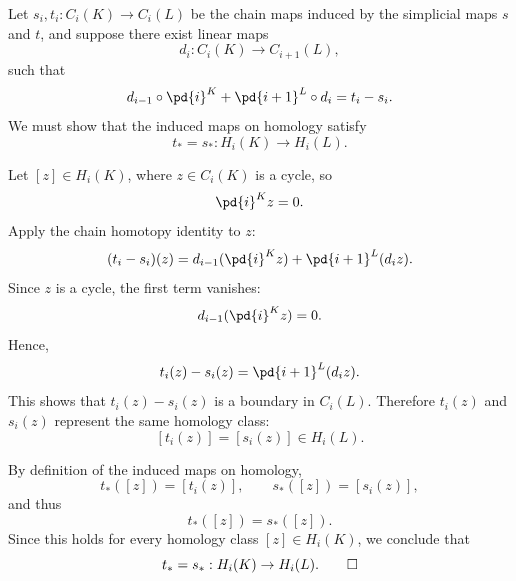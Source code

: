 \begin{solution}
  Let $s_i, t_i : C_i(K) \to C_i(L)$ be the chain maps induced by the simplicial maps $s$ and $t$, and suppose there exist linear maps
  \[%
    d_i : C_i(K) \to C_{i+1}(L)
  ,\]%
  such that
  \[%
    d_{i-1} \circ \pd{i}^K + \pd{i+1}^L \circ d_i = t_i - s_i
  .\]%
  We must show that the induced maps on homology satisfy
  \[%
    t_* = s_* : H_i(K) \to H_i(L)
  .\]%

  Let $[z] \in H_i(K)$, where $z \in C_i(K)$ is a cycle, so
  \[%
    \pd{i}^K z = 0
  .\]%
  Apply the chain homotopy identity to $z$:
  \[%
    (t_i - s_i)(z) = d_{i-1}(\pd{i}^K z) + \pd{i+1}^L(d_i z)
  .\]%
  Since $z$ is a cycle, the first term vanishes:
  \[%
    d_{i-1}(\pd{i}^K z) = 0
  .\]%
  Hence,
  \[%
    t_i(z) - s_i(z) = \pd{i+1}^L(d_i z)
  .\]%
  This shows that $t_i(z) - s_i(z)$ is a boundary in $C_i(L)$. Therefore $t_i(z)$ and $s_i(z)$ represent the same homology class:
  \[%
    [t_i(z)] = [s_i(z)] \in H_i(L)
  .\]%

  By definition of the induced maps on homology,
  \[%
    t_*([z]) = [t_i(z)], \qquad s_*([z]) = [s_i(z)]
  ,\]%
  and thus
  \[%
    t_*([z]) = s_*([z])
  .\]%
  Since this holds for every homology class $[z] \in H_i(K)$, we conclude that
  \[%
    t_* = s_* : H_i(K) \to H_i(L)
  .\qedhere\]%
\end{solution}

